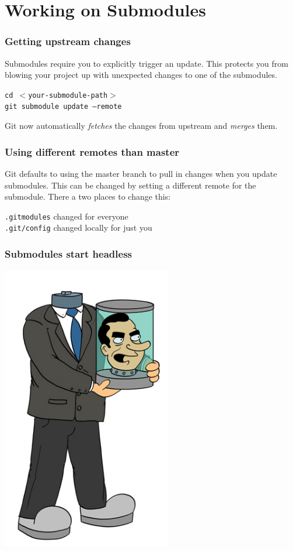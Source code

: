\section{Working on Submodules}

\begin{frame}[fragile]
  \frametitle{Getting upstream changes}
   Submodules require you to  \alert{explicitly} trigger an update.
   This protects you from blowing your project up with unexpected changes to one of the submodules.    
  \begin{center}\texttt{cd $<$your-submodule-path$>$}\\ \texttt{git submodule update --remote} \end{center}
  
  Git now automatically \emph{fetches} the changes from upstream and \emph{merges} them.

\end{frame}

\begin{frame}[fragile]
  \frametitle{Using different remotes than master}
  Git defaults to using the master branch to pull in changes when you update submodules.
  This can be changed by setting a different remote for the submodule. There a two places to change this:
\begin{center} 
  \texttt{.gitmodules} changed for everyone \\
  \texttt{.git/config} changed locally for just you
\end{center}
\end{frame}

\begin{frame}
\frametitle{Submodules start headless}
 \begin{center}
 \includegraphics[width=280px]{images/nixon.jpg}
 \end{center}
\end{frame}


